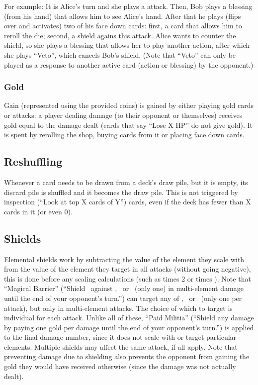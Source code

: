 \documentclass[dvipsnames,parskip,a4paper]{scrartcl}
\newcommand{\iconsize}{3.4mm}
\newcommand{\icondepth}{0.45mm}
\newcommand{\icon}[1]{\raisebox{-\icondepth}{\texttt{[image:  \#1 ]}}}
\newcommand{\fire}{\icon{icons/fire.png}}
\newcommand{\earth}{\icon{icons/earth.png}}
\newcommand{\water}{\icon{icons/water.png}}
\newcommand{\magic}{\icon{icons/magic.png}}
\begin{document}
For example: It is Alice's turn and she plays a \fire attack. Then, Bob plays a blessing (from his hand) that allows him to see Alice's hand. After that he plays (flips over and activates) two of his face down cards: first, a card that allows him to reroll the \fire die; second, a \water shield agains this attack. Alice wants to counter the shield, so she plays a blessing that allows her to play another action, after which she plays ``Veto'', which cancels Bob's shield. (Note that ``Veto'' can only be played as a response to another active card (action or blessing) by the opponent.)

\subsubsection*{Gold}

Gain (represented using the provided coins) is gained by either playing gold cards or attacks: a player dealing damage (to their opponent or themselves) receives gold equal to the damage dealt (cards that say ``Lose X HP'' do not give gold). It is spent by rerolling the shop, buying cards from it or placing face down cards.

\subsection*{Reshuffling}

Whenever a card needs to be drawn from a deck's draw pile, but it is empty, its discard pile is shuffled and it becomes the draw pile. This is not triggered by inspection (``Look at top X cards of Y'') cards, even if the deck has fewer than X cards in it (or even 0).

\subsection*{Shields}

Elemental shields work by subtracting the value of the element they scale with from the value of the element they target in all attacks (without going negative), this is done before any scaling calculations (such as times 2 or times \magic). Note that ``Magical Barrier'' (``Shield \magic \ against \fire, \earth \ or \water \ (only one) in multi-element damage until the end of your opponent's turn.'') can target any of \fire, \earth \ or \water \ (only one per attack), but only in multi-element attacks. The choice of which to target is individual for each attack. Unlike all of these, ``Paid Militia'' (``Shield any damage by paying one gold per damage until the end of your opponent's turn.'') is applied to the final damage number, since it does not scale with or target particular elements. Multiple shields may affect the same attack, if all apply. Note that preventing damage due to shielding also prevents the opponent from gaining the gold they would have received otherwise (since the damage was not actually dealt).
\end{document}
